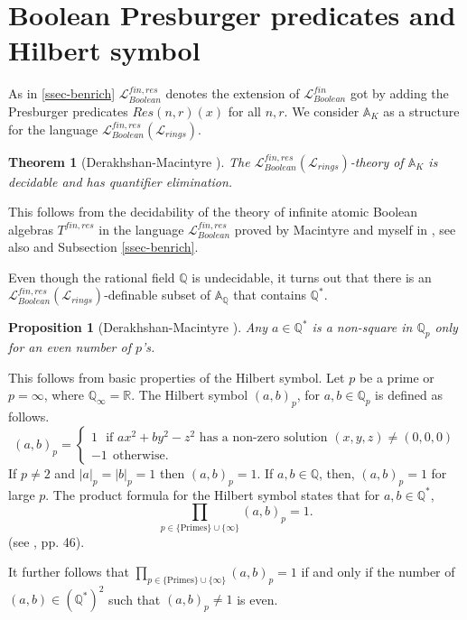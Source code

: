 \documentclass[12pt]{amsart}
\def\A{\mathbb{A}}
\def\R{\mathbb{R}}
\def\cL{\mathcal{L}}
\def\R{\mathbb{R}}
\def\Q{\mathbb{Q}}
\def\cL{\mathcal{L}}
\newtheorem{thm}{Theorem}[section]
\newtheorem{prop}{Proposition}[section]
\numberwithin{equation}{section}
\begin{document}
\section{\bf Boolean Presburger predicates and Hilbert symbol}\label{sec-recip}

As in \ref{ssec-benrich} $\cL_{Boolean}^{fin,res}$ denotes the extension of $\cL_{Boolean}^{fin}$ got by adding the Presburger predicates $Res(n,r)(x)$ 
for all $n,r$. We consider $\A_K$ as a structure for the language $\cL^{fin,res}_{Boolean}(\cL_{rings})$. 

\begin{thm} [Derakhshan-Macintyre {\cite{DM-ad}}]\label{dec-pres} The $\cL^{fin,res}_{Boolean}(\cL_{rings})$-theory of $\A_K$ is decidable and has quantifier elimination.
\end{thm}

This follows from the decidability of the theory of infinite atomic Boolean algebras $T^{fin,res}$ in the language $\cL_{Boolean}^{fin,res}$ proved by Macintyre and myself in \cite{DM-bool}, see also \cite{DM-ad} and Subsection \ref{ssec-benrich}. 

Even though the rational field $\Q$ is undecidable, it turns out that there is an $\cL^{fin,res}_{Boolean}(\cL_{rings})$-definable subset of $\A_{\Q}$ that contains $\Q^*$. 

\begin{prop} [Derakhshan-Macintyre {\cite{DM-ad}}]\label{hilbert1} Any $a\in \Q^*$ is a non-square in $\Q_p$ only for an even number of $p$'s.\end{prop}
This follows from basic properties of the Hilbert symbol.  
Let $p$ be a prime or $p=\infty$, where $\Q_{\infty}=\R$. 
The Hilbert symbol $(a,b)_p$, for $a,b \in \Q_p$ 
is defined as follows.
$$
(a,b)_p=\begin{cases}
 1 ~ ~ ~ \text{if $ax^2+by^2-z^2$ has a non-zero solution $(x,y,z)\neq (0,0,0)$}\\
 -1 ~ ~ \text{otherwise.}
\end{cases}
$$ 
If $p\neq 2$ and $|a|_p=|b|_p=1$ then $(a,b)_p=1$. If $a,b\in \Q$, then, $(a,b)_p=1$ for large $p$. 
The product formula for the Hilbert symbol states that for $a,b \in \Q^*$,
$$\prod_{p \in \{\mathrm{Primes}\}\cup \{\infty\}} (a,b)_p=1.$$
(see \cite{cassels-local}, pp. 46).

It further follows that 
$\prod_{p \in \{\mathrm{Primes}\}\cup \{\infty\}} (a,b)_p=1$ if and only if the number of $(a,b) \in (\Q^*)^2$ such that 
$(a,b)_p \neq 1$ is even. 
\end{document}
